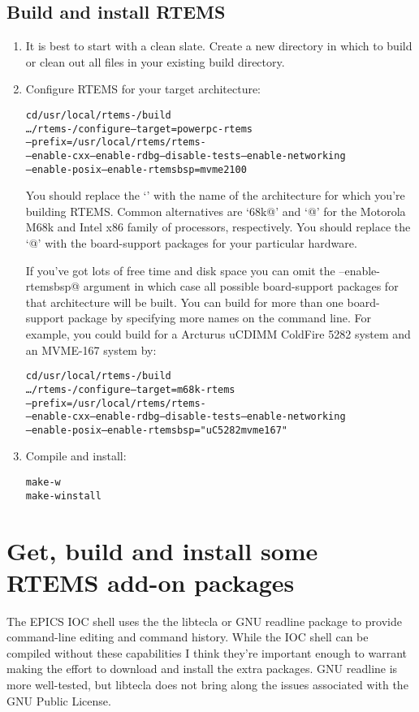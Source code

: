 \documentclass{report}
\begin{document}
\subsection{Build and install RTEMS}
\label{RTEMS_BSP_CONFIG}
\begin{enumerate}
\item
It is best to start with a clean slate.  Create a new directory in which to build or clean out all files in your existing build directory.

\item
Configure RTEMS for your target architecture:
\begin{alltt}
cd /usr/local/rtems-\rtemsVersion/build
\ldots/rtems-\rtemsVersion/configure --target=powerpc-rtems\rtemsVersion \verb@\@
  --prefix=/usr/local/rtems/rtems-\rtemsVersion \verb@\@
  --enable-cxx --enable-rdbg --disable-tests --enable-networking \verb@\@
  --enable-posix --enable-rtemsbsp=mvme2100 \verb@\@
\end{alltt}
You should replace the `\verb@powerpc@' with the name of the architecture
for which you're building RTEMS.  Common alternatives
are `\verb@m68k@' and `@' for
the Motorola M68k and Intel x86 family of processors, respectively.
You should replace the `@' with the board-support packages
for your particular hardware.

If you've got lots of free time and disk space
you can omit the \verb@--enable-rtemsbsp@ argument in which case all
possible board-support packages for that architecture will be built.
You can build for more than one board-support package by specifying
more names on the command line.  For example,
you could build for a Arcturus uCDIMM ColdFire 5282 system and an MVME-167 system
by:
\begin{alltt}
cd /usr/local/rtems-\rtemsVersion/build
\ldots/rtems-\rtemsVersion/configure --target=m68k-rtems\rtemsVersion \verb@\@
      --prefix=/usr/local/rtems/rtems-\rtemsVersion \verb@\@
      --enable-cxx --enable-rdbg --disable-tests --enable-networking \verb@\@
      --enable-posix --enable-rtemsbsp="uC5282 mvme167" \verb@\@
\end{alltt}

\item
Compile and install:
\begin{alltt}
make -w
make -w install
\end{alltt}
\end{enumerate}


\section{Get, build and install some RTEMS add-on packages}
The EPICS IOC shell uses the the libtecla or GNU readline package to provide command-line editing and command history.
While the IOC shell can be compiled without these capabilities I think they're important enough to warrant
making the effort to download and install the extra packages.
GNU readline is more well-tested, but libtecla does not bring along
the issues associated with the GNU Public License.
\end{document}

